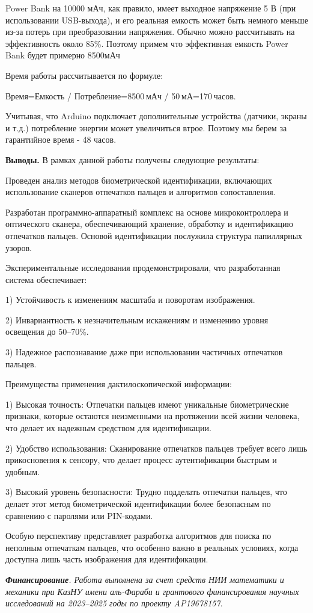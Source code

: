 \begin{multicols}{2}
Power Bank на 10000 мАч, как правило, имеет выходное напряжение 5 В (при
использовании USB-выхода), и его реальная емкость может быть немного
меньше из-за потерь при преобразовании напряжения. Обычно можно
рассчитывать на эффективность около 85\%. Поэтому примем что эффективная
емкость Power Bank будет примерно 8500мАч

Время работы рассчитывается по формуле:

Время=Емкость / Потребление=8500 мАч / 50 мА=170 часов.

Учитывая, что Arduino подключает дополнительные устройства (датчики,
экраны и т.д.) потребление энергии может увеличиться втрое. Поэтому мы
берем за гарантийное время - 48 часов.

{\bfseries Выводы.} В рамках данной работы получены следующие результаты:

Проведен анализ методов биометрической идентификации, включающих
использование сканеров отпечатков пальцев и алгоритмов сопоставления.

Разработан программно-аппаратный комплекс на основе микроконтроллера и
оптического сканера, обеспечивающий хранение, обработку и идентификацию
отпечатков пальцев. Основой идентификации послужила структура
папиллярных узоров.

Экспериментальные исследования продемонстрировали, что разработанная
система обеспечивает:

1) Устойчивость к изменениям масштаба и поворотам изображения.

2) Инвариантность к незначительным искажениям и изменению уровня
освещения до 50--70\%.

3) Надежное распознавание даже при использовании частичных отпечатков
пальцев.

Преимущества применения дактилоскопической информации:

1) Высокая точность: Отпечатки пальцев имеют уникальные биометрические
признаки, которые остаются неизменными на протяжении всей жизни
человека, что делает их надежным средством для идентификации.

2) Удобство использования: Сканирование отпечатков пальцев требует всего
лишь прикосновения к сенсору, что делает процесс аутентификации быстрым
и удобным.

3) Высокий уровень безопасности: Трудно подделать отпечатки пальцев, что
делает этот метод биометрической идентификации более безопасным по
сравнению с паролями или PIN-кодами.

Особую перспективу представляет разработка алгоритмов для поиска по
неполным отпечаткам пальцев, что особенно важно в реальных условиях,
когда доступна лишь часть изображения для идентификации.

\emph{{\bfseries Финансирование}. Работа выполнена за счет средств НИИ
математики и механики при КазНУ имени аль-Фараби и грантового
финансирования научных исследований на 2023--2025 годы по проекту
AP19678157}.
\end{multicols}

